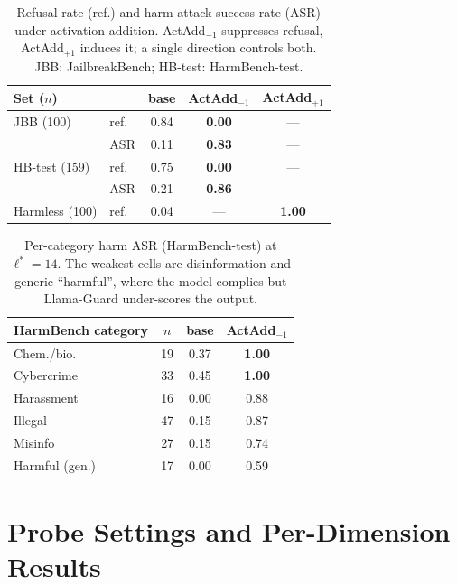 \documentclass[11pt]{article}
\begin{document}
\begin{table}[t]
\centering
{\small
\setlength{\tabcolsep}{4pt}
\begin{tabular}{@{}llccc@{}}
\toprule
Set ($n$) &      & base & ActAdd$_{-1}$ & ActAdd$_{+1}$ \\
\midrule
JBB (100)      & ref. & 0.84 & \textbf{0.00} & ---           \\
               & ASR  & 0.11 & \textbf{0.83} & ---           \\
HB-test (159)  & ref. & 0.75 & \textbf{0.00} & ---           \\
               & ASR  & 0.21 & \textbf{0.86} & ---           \\
Harmless (100) & ref. & 0.04 & ---           & \textbf{1.00} \\
\bottomrule
\end{tabular}}
\caption{Refusal rate (ref.) and harm attack-success rate (ASR) under activation addition. ActAdd$_{-1}$ suppresses refusal, ActAdd$_{+1}$ induces it; a single direction controls both. JBB: JailbreakBench; HB-test: HarmBench-test.}
\label{tab:refusal-main}
\end{table}

\begin{table}[t]
\centering
{\small
\begin{tabular}{@{}lccc@{}}
\toprule
HarmBench category & $n$ & base & ActAdd$_{-1}$ \\
\midrule
Chem./bio.      & 19 & 0.37 & \textbf{1.00} \\
Cybercrime      & 33 & 0.45 & \textbf{1.00} \\
Harassment      & 16 & 0.00 & 0.88 \\
Illegal         & 47 & 0.15 & 0.87 \\
Misinfo         & 27 & 0.15 & 0.74 \\
Harmful (gen.)  & 17 & 0.00 & 0.59 \\
\bottomrule
\end{tabular}}
\caption{Per-category harm ASR (HarmBench-test) at $\ell^{*}=14$. The weakest cells are disinformation and generic ``harmful'', where the model complies but Llama-Guard under-scores the output.}
\label{tab:refusal-cat}
\end{table}






\section{Probe Settings and Per-Dimension Results}
\label{app:probes}
\end{document}
